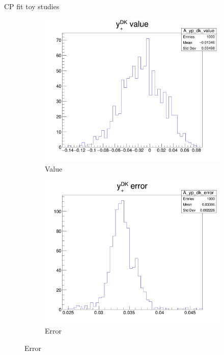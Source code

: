 \documentclass{beamer}
\begin{document}
\begin{frame}{CP fit toy studies}
  \begin{figure}
    \centering
    \begin{subfigure}{0.25\textwidth}
      \includegraphics[width = 1.0\textwidth]{Plots/A_yp_dk_value.png}
      \caption{Value}
    \end{subfigure}%
    \begin{subfigure}{0.25\textwidth}
      \includegraphics[width = 1.0\textwidth]{Plots/A_yp_dk_error.png}
      \caption{Error}
    \end{subfigure}%

\end{figure}
\end{frame}
\end{document}

